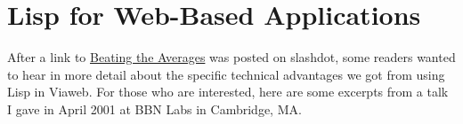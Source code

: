 \chapter{Lisp for Web-Based Applications}


            
              
                


                    After a link to
                    \href{http://www.paulgraham.com/avg.html}{Beating the Averages} was posted on
                    slashdot, some readers wanted to hear in more detail about
                    the specific technical advantages we got from using Lisp in
                    Viaweb. For those who are interested, here are some excerpts
                    from a talk I gave in April 2001 at BBN Labs in Cambridge,
                    MA.



              
            
          
